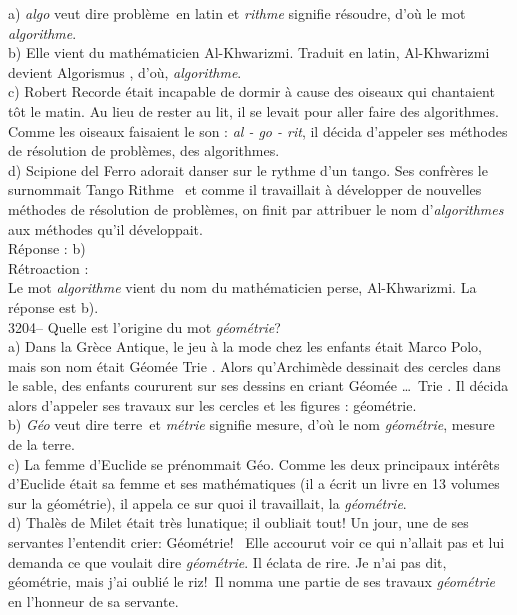 \documentclass[letterpaper, 12pt]{article}
\begin{document}
a) \emph{algo} veut dire \og probl\`eme\fg \ en latin et \emph{rithme} signifie \og r\'esoudre\fg, d'o\`u le mot \emph{algorithme}.\\[2mm]
b) Elle vient du math\'ematicien Al-Khwarizmi. Traduit en latin, Al-Khwarizmi devient \og Algorismus \fg, d'o\`u, \emph{algorithme}.\\[2mm]
c) Robert Recorde \'etait incapable de dormir \`a cause des oiseaux qui chantaient t\^ot le matin. Au lieu de rester au lit, il se levait pour aller faire des algorithmes. Comme les oiseaux faisaient le son : \emph{al - go - rit}, il d\'ecida d'appeler ses m\'ethodes de r\'esolution de probl\`emes, des algorithmes.\\[2mm]
d) Scipione del Ferro adorait danser sur le rythme d'un tango. Ses confr\`eres le surnommait \og Tango Rithme \fg \ et comme il travaillait \`a d\'evelopper de nouvelles m\'ethodes de r\'esolution de probl\`emes, on finit par attribuer le nom d'\emph{algorithmes} aux m\'ethodes qu'il d\'eveloppait.\\[2mm]

R\'eponse : b)\\

R\'etroaction :\\
Le mot \emph{algorithme} vient du nom du math\'ematicien perse, Al-Khwarizmi. La r\'eponse est b).\\



3204-- Quelle est l'origine du mot \emph{g\'eom\'etrie}?\\

a) Dans la Gr\`ece Antique, le jeu \`a la mode chez les enfants \'etait \og Marco Polo\fg, mais son nom \'etait \og G\'eom\'ee Trie \fg. Alors qu'Archim\`ede dessinait des cercles dans le sable, des enfants coururent sur ses dessins en criant \og G\'eom\'ee \dots \ Trie \fg. Il d\'ecida alors d'appeler ses travaux sur les cercles et les figures : g\'eom\'etrie.\\[2mm]
b) \emph{G\'eo} veut dire \og terre\fg \ et \emph{m\'etrie} signifie \og mesure\fg, d'o\`u le nom \emph{g\'eom\'etrie}, mesure de la terre.\\[2mm]
c) La femme d'Euclide se pr\'enommait G\'eo. Comme les deux principaux int\'er\^ets d'Euclide \'etait sa femme et ses math\'ematiques (il a \'ecrit un livre en 13 volumes sur la g\'eom\'etrie), il appela ce sur quoi il travaillait, la \emph{g\'eom\'etrie}.\\[2mm]
d) Thal\`es de Milet \'etait tr\`es lunatique; il oubliait tout! Un jour, une de ses servantes l'entendit crier: \og G\'eom\'etrie! \fg \ Elle accourut voir ce qui n'allait pas et lui demanda ce que voulait dire \emph{g\'eom\'etrie}. Il \'eclata de rire. \og Je n'ai pas dit, g\'eom\'etrie, mais j'ai oubli\'e le riz!\fg \ Il nomma une partie de ses travaux \emph{g\'eom\'etrie} en l'honneur de sa servante.\\[2mm]
\end{document}
